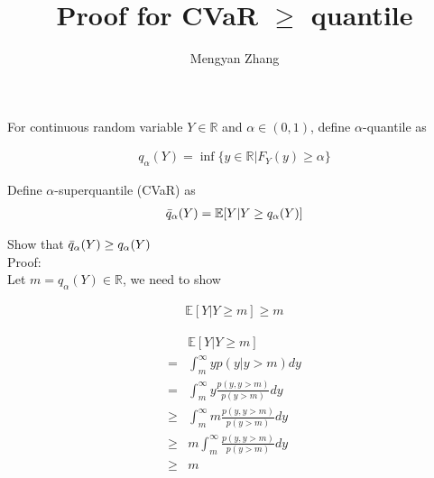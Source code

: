 \documentclass[11pt]{article}
\begin{document}
\author{Mengyan Zhang}
\title{Proof for CVaR $\geq$ quantile}
\maketitle

\medskip

For continuous random variable $Y \in \mathbb{R}$ and $\alpha \in (0,1)$, define $\alpha$-quantile as

\begin{align}
        q_\alpha(Y) = \inf \{y \in \mathbb{R}| F_Y (y) \geq \alpha \}
    \end{align}
    
Define $\alpha$-superquantile (CVaR) as
\begin{align}
    \Bar{q}_\alpha(Y) = \mathbb{E}[Y|Y \geq q_\alpha(Y)]
\end{align}

Show that $\Bar{q}_\alpha(Y) \geq q_\alpha(Y)$\\

Proof:\\

Let $m = q_\alpha(Y) \in \mathbb{R}$, we need to show 

\begin{align}
    \mathbb{E}[Y|Y \geq m] \geq m
\end{align}

\begin{align}
    & \mathbb{E}[Y|Y \geq m]\\
    =& \int_{m}^\infty y p(y|y>m) dy\\
    =& \int_{m}^\infty y \frac{p(y,y>m)}{p(y>m)} dy\\
    \geq & \int_{m}^\infty m \frac{p(y,y>m)}{p(y>m)} dy\\
    \geq & m \int_{m}^\infty \frac{p(y,y>m)}{p(y>m)} dy\\
    \geq & m 
\end{align}
\end{document}
